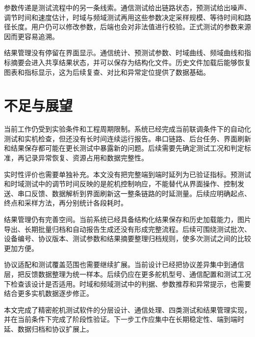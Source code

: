 参数传递是测试流程中的另一条线索。通信测试给出链路状态，预测试给出噪声、调节时间和速度估计，时域与频域测试再用这些参数决定采样规模、等待时间和路径长度。用户仍可以修改参数，后端也会对非法值进行校验。正式测试的参数来源因而更容易追溯。

结果管理没有停留在界面显示。通信统计、预测试参数、时域曲线、频域曲线和指标摘要会进入共享结果状态，并可以保存为结构化文件。历史文件加载后能够恢复图表和指标显示，这为后续复查、对比和异常定位提供了数据基础。

\section{不足与展望}

当前工作仍受到实验条件和工程周期限制。系统已经完成当前联调条件下的自动化测试和实机检查，但还没有长时间连续运行报告。串口链路、后台任务、界面刷新和结果保存都可能在更长测试中暴露新的问题。后续需要先确定测试工况和判定标准，再记录异常恢复、资源占用和数据完整性。

实时性评价也需要单独补充。本文没有把完整端到端时延列为已验证指标。预测试和时域测试中的调节时间反映的是舵机控制响应，不能替代从界面操作、控制发送、串口反馈、数据解析到界面刷新这一整条链路的时延测量。后续应明确起点、终点和采样方法，再分别统计各段耗时。

结果管理仍有完善空间。当前系统已经具备结构化结果保存和历史加载能力，图片导出、长期批量归档和自动报告生成还没有形成完整流程。后续可围绕测试批次、设备编号、协议版本、测试参数和结果摘要整理归档规则，使多次测试之间的比较更加方便。

协议适配和测试覆盖范围也需要继续扩展。当前设计已经把协议差异集中到通信层，把反馈数据整理为统一样本。后续仍应在更多舵机型号、通信配置和测试工况下检查该设计是否适用。时域和频域测试中的判据、参数推荐和异常提示，也需要结合更多实机数据逐步修正。

本文完成了精密舵机测试软件的分层设计、通信处理、四类测试和结果管理实现，并在当前条件下完成了阶段性验证。下一步工作应集中在长期稳定性、端到端时延、数据归档和协议扩展上。
